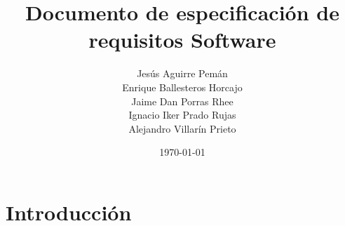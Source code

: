 \documentclass[spanish,a4paper,12pt]{report}		%
\begin{document}
\title{\textbf{\huge{Documento de especificación de \\ requisitos Software}}}
\author{ Jesús Aguirre Pemán \\
	 Enrique Ballesteros Horcajo \\
	 Jaime Dan Porras Rhee \\
	 Ignacio Iker Prado Rujas \\
	 Alejandro Villarín Prieto }
\date{\today}
\maketitle

\newpage
\mbox{}
\thispagestyle{empty}


\tableofcontents 		%

\newpage
\mbox{}
\thispagestyle{empty}
\newpage

\section{Introducción}
\end{document}
